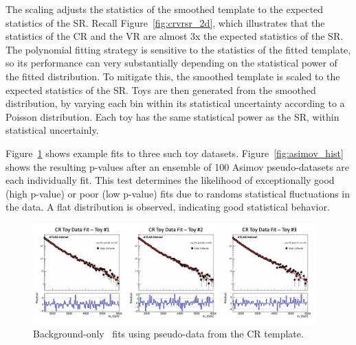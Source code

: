 The scaling adjusts the statistics of the smoothed template to the expected statistics of the SR.
Recall Figure~\ref{fig:crvrsr_2d}, which illustrates that the statistics of the CR and the VR are almost 3x the expected statistics of the SR.
The polynomial fitting strategy is sensitive to the statistics of the fitted template, so its performance can very substantially depending on the statistical power of the fitted distribution.
To mitigate this, the smoothed template is scaled to the expected statistics of the SR.
Toys are then generated from the smoothed distribution, by varying each bin within its statistical uncertainty according to a Poisson distribution. 
Each toy has the same statistical power as the SR, within statistical uncertainly.

Figure~\ref{fig:bkgfit_data} shows example fits to three such toy datasets.
Figure~\ref{fig:asimov_hist} shows the resulting p-values after an ensemble of 100 Asimov pseudo-datasets are each individually fit. 
This test determines the likelihood of exceptionally good (high p-value) or poor (low p-value) fits due to randoms statistical fluctuations in the data. 
A flat distribution is observed, indicating good statistical behavior. 

\begin{figure}[!htbp]
\centering
   \includegraphics[width=0.97\textwidth]{figures/stats/bkgfit_data_cr}
    \caption{Background-only \mt~fits using pseudo-data from the CR template.
     \label{fig:bkgfit_data}}
\end{figure}

